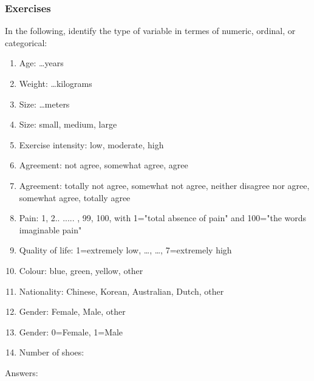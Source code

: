 \subsubsection{Exercises} 
In the following, identify the type of variable in termes of numeric, ordinal, or categorical:
\begin{enumerate}
\item Age: \dots years
\item Weight: \dots kilograms
\item Size: \dots meters
\item Size: small, medium, large
\item Exercise intensity: low, moderate, high
\item Agreement: not agree, somewhat agree, agree
\item Agreement: totally not agree, somewhat not agree, neither disagree nor agree, somewhat agree, totally agree
\item Pain: 1, 2.. ..... , 99, 100, with 1="total absence of pain" and 100="the words imaginable pain"
\item Quality of life: 1=extremely low, \dots, \dots, 7=extremely high
\item Colour: blue, green, yellow, other
\item Nationality: Chinese, Korean, Australian, Dutch, other
\item Gender: Female, Male, other 
\item Gender: 0=Female, 1=Male
\item Number of shoes: 
\end{enumerate}

Answers:


